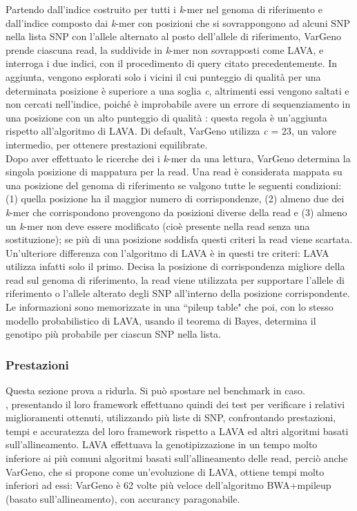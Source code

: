 \documentclass[../main.tex]{subfiles}
\begin{document}
\noindent
Partendo dall'indice costruito per tutti i \textit{k}-mer nel genoma di riferimento e dall'indice composto dai \textit{k}-mer con posizioni che si sovrappongono ad alcuni SNP nella lista SNP con l'allele alternato al posto dell'allele di riferimento, VarGeno prende ciascuna read, la suddivide in \textit{k}-mer non sovrapposti come LAVA, e interroga i due indici, con il procedimento di query citato precedentemente. In aggiunta, vengono esplorati solo i vicini il cui punteggio di qualità per una determinata posizione è superiore a una soglia \textit{c}, altrimenti essi vengono saltati e non cercati nell'indice, poiché è improbabile avere un errore di sequenziamento in una posizione con un alto punteggio di qualità \cite{sun-medvedev2018vargeno}: questa regola è un'aggiunta rispetto all'algoritmo di LAVA. Di default, VarGeno utilizza \textit{c} = 23, un valore intermedio, per ottenere prestazioni equilibrate. \\

\noindent
Dopo aver effettuato le ricerche dei i \textit{k}-mer da una lettura, VarGeno determina la singola posizione di mappatura per la read. Una read è considerata mappata su una posizione del genoma di riferimento se valgono tutte le seguenti condizioni: (1) quella posizione ha il maggior numero di corrispondenze, (2) almeno due dei \textit{k}-mer che corrispondono provengono da posizioni diverse della read e (3) almeno un \textit{k}-mer non deve essere modificato (cioè presente nella read senza una sostituzione); se più di una posizione soddisfa questi criteri la read viene scartata. Un'ulteriore differenza con l'algoritmo di LAVA è in questi tre criteri: LAVA utilizza infatti solo il primo. Decisa la posizione di corrispondenza migliore della read sul genoma di riferimento, la read viene utilizzata per supportare l'allele di riferimento o l'allele alterato degli SNP all'interno della posizione corrispondente. Le informazioni sono memorizzate in una ``pileup table" che poi, con lo stesso modello probabilistico di LAVA, usando il teorema di Bayes, determina il genotipo più probabile per ciascun SNP nella lista.

\subsubsection{Prestazioni}

\textcolor{BurntOrange}{Questa sezione prova a ridurla. Si può spostare nel benchmark in caso.\\}
\cite{sun-medvedev2018vargeno}, presentando il loro framework effettuano quindi dei test per verificare i relativi miglioramenti ottenuti, utilizzando più liste di SNP, confrontando prestazioni, tempi e accuratezza del loro framework rispetto a LAVA ed altri algoritmi basati sull'allineamento. LAVA effettuava la genotipizzazione in un tempo molto inferiore ai più comuni algoritmi basati sull'allineamento delle read, perciò anche VarGeno, che si propone come un'evoluzione di LAVA, ottiene tempi molto inferiori ad essi: VarGeno è 62 volte più veloce dell'algoritmo BWA+mpileup (basato sull'allineamento), con accurancy paragonabile. 
\end{document}
